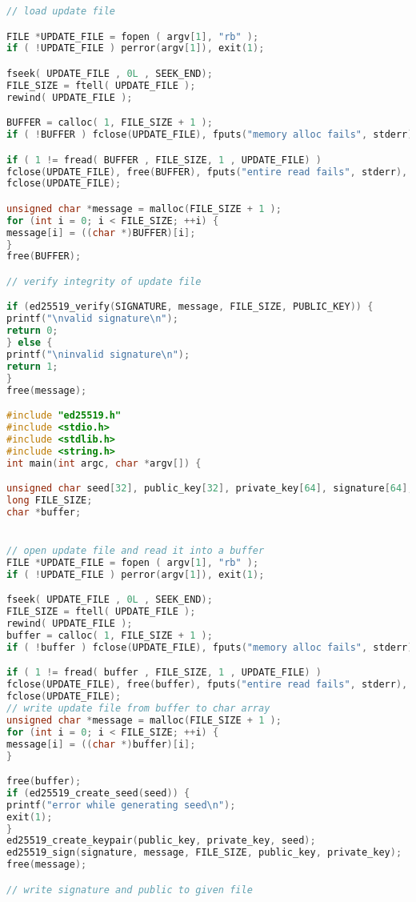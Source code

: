 \documentclass[thesis=bachelor,faculty=cb]{hsmw-thesis}
\begin{document}
\begin{lstlisting}[language=C]
// load update file

FILE *UPDATE_FILE = fopen ( argv[1], "rb" );
if ( !UPDATE_FILE ) perror(argv[1]), exit(1);

fseek( UPDATE_FILE , 0L , SEEK_END);
FILE_SIZE = ftell( UPDATE_FILE );
rewind( UPDATE_FILE );

BUFFER = calloc( 1, FILE_SIZE + 1 );
if ( !BUFFER ) fclose(UPDATE_FILE), fputs("memory alloc fails", stderr), exit(1);

if ( 1 != fread( BUFFER , FILE_SIZE, 1 , UPDATE_FILE) )
fclose(UPDATE_FILE), free(BUFFER), fputs("entire read fails", stderr), exit(1);
fclose(UPDATE_FILE);

unsigned char *message = malloc(FILE_SIZE + 1 );
for (int i = 0; i < FILE_SIZE; ++i) {
message[i] = ((char *)BUFFER)[i];
}
free(BUFFER);

// verify integrity of update file

if (ed25519_verify(SIGNATURE, message, FILE_SIZE, PUBLIC_KEY)) {
printf("\nvalid signature\n");
return 0;
} else {
printf("\ninvalid signature\n");
return 1;
}
free(message);

#include "ed25519.h"
#include <stdio.h>
#include <stdlib.h>
#include <string.h>
int main(int argc, char *argv[]) {

unsigned char seed[32], public_key[32], private_key[64], signature[64];
long FILE_SIZE;
char *buffer;


// open update file and read it into a buffer
FILE *UPDATE_FILE = fopen ( argv[1], "rb" );
if ( !UPDATE_FILE ) perror(argv[1]), exit(1);

fseek( UPDATE_FILE , 0L , SEEK_END);
FILE_SIZE = ftell( UPDATE_FILE );
rewind( UPDATE_FILE );
buffer = calloc( 1, FILE_SIZE + 1 );
if ( !buffer ) fclose(UPDATE_FILE), fputs("memory alloc fails", stderr), exit(1);

if ( 1 != fread( buffer , FILE_SIZE, 1 , UPDATE_FILE) )
fclose(UPDATE_FILE), free(buffer), fputs("entire read fails", stderr), exit(1);
fclose(UPDATE_FILE);
// write update file from buffer to char array
unsigned char *message = malloc(FILE_SIZE + 1 );
for (int i = 0; i < FILE_SIZE; ++i) {
message[i] = ((char *)buffer)[i];
}

free(buffer);
if (ed25519_create_seed(seed)) {
printf("error while generating seed\n");
exit(1);
}
ed25519_create_keypair(public_key, private_key, seed);
ed25519_sign(signature, message, FILE_SIZE, public_key, private_key);
free(message);

// write signature and public to given file


\end{lstlisting}
\end{document}
